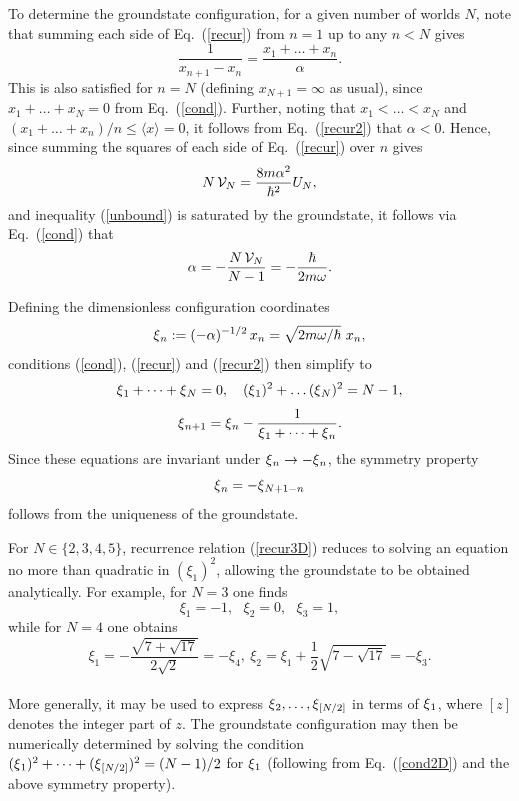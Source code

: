 \documentclass[twocolumn,aps,pra,amsmath,amssymb,superscriptaddress]{revtex4}
\renewcommand{\(}{\left(}
\renewcommand{\)}{\right)}
\newcommand{\blk}{\color{black}}
\newcommand{\blu}{\color{blue}}
\renewcommand\blu{\blk}
\begin{document}
{To determine the groundstate configuration, for a given number of worlds $N$, note that summing each side of Eq.~(\ref{recur}) from $n=1$ up to any $n<N$ gives
\begin{equation} \label{recur2}
\frac{1}{x_{n+1}-x_n} = \frac{x_1+\dots+x_n}{\alpha} . 
\end{equation}
This is also satisfied for $n=N$ (defining  $x_{N+1}=\infty$ as usual), since $x_1+\dots+x_N=0$ from Eq.~(\ref{cond}).  Further, noting that $x_1<\dots<x_N$ and $(x_1+\dots+x_n)/n\leq \langle x\rangle=0$, it follows from Eq.~(\ref{recur2}) that $\alpha<0$.  Hence, since summing the squares of each side of Eq.~(\ref{recur}) over $n$ gives
\[ N\, {\blk {\cal V}_N} = \frac{8m\alpha^2}{\hbar^2} U_N , \]
and inequality (\ref{unbound}) is saturated by the groundstate, it follows via Eq.~(\ref{cond}) that 
\begin{equation} 
\alpha = -\frac{N\, {\cal V}_N}{N-1} = -\frac{\hbar}{2m\omega}.
\end{equation}

Defining the dimensionless configuration coordinates
\begin{equation} \label{qndefD}
{\blk \xi}_n := (-\alpha)^{-1/2} \,x_n = \sqrt{2m\omega/\hbar} \,\,x_n , 
\end{equation}
conditions (\ref{cond}), (\ref{recur}) and (\ref{recur2}) then simplify to
\begin{equation} \label{cond2D}
{\blk \xi}_1+\dots+{\blk \xi}_N = 0,~~~({\blk \xi}_1)^2+\dots ({\blk \xi}_N)^2 = N-1,
\end{equation}
\begin{equation}
\label{recur3D}
{\blk \xi}_{n+1} = {\blk \xi}_n - \frac{1}{{\blk \xi}_1+\dots+{\blk \xi}_n}.
\end{equation}
Since these equations are invariant under ${\blk \xi}_n\rightarrow-{\blk \xi}_n$, the symmetry property 
\begin{equation} 
{\blk \xi}_{n}=-{\blk \xi}_{N+1-n}  
\end{equation}
follows from the uniqueness of the groundstate.

\blk For $N \in \{2,3,4,5\}$, recurrence relation (\ref{recur3D})  
reduces to solving an equation no more than quadratic in \blu $({ \xi}_1)^2$, \blk allowing the groundstate 
to be obtained analytically. For example, for $N=3$ one finds 
\[{ \xi}_1=-1, ~~~{ \xi}_2=0, ~~~ { \xi}_3=1, \] 
while for $N=4$ one obtains 
$$ { \xi}_1 = -\frac{\sqrt{7+\sqrt{17}}}{2\sqrt{2}}=-{ \xi}_4,~ { \xi}_2={ \xi}_1+\frac{1}{2}\sqrt{7-\sqrt{17}}=-{ \xi}_3 . $$ \\
 \blk More generally, it may be used to express ${\blk \xi}_2,\dots,{\blk \xi}_{[N/2]}$ in terms of ${\blk \xi}_1$, where $[z]$ denotes the integer part of $z$.  The groundstate configuration may then be numerically determined by solving the condition $({\blk \xi}_1)^2+\dots+({\blk \xi}_{[N/2]})^2=(N-1)/2$ for ${\blk \xi}_1$ (following from Eq.~(\ref{cond2D}) and the above symmetry property).


}
\end{document}
